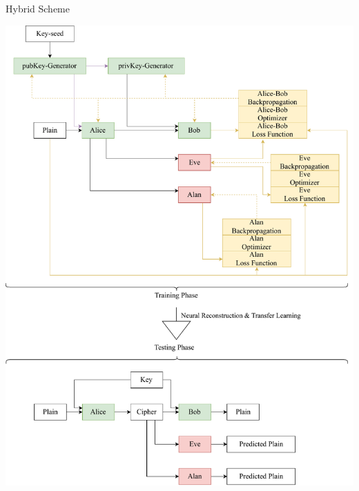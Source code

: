 \documentclass{beamer}
\begin{document}
		\begin{frame}{Hybrid Scheme}
			\begin{center}
				\includegraphics[height=0.9\textheight]{hybridScheme}
			\end{center}
		\end{frame}
\end{document}
